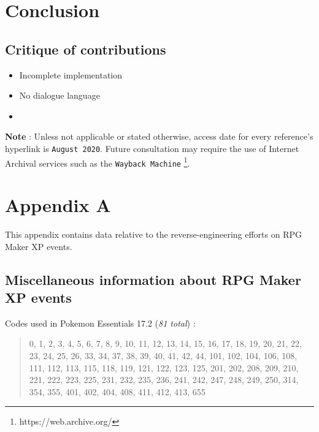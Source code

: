 \documentclass[11pt]{article}
\begin{document}
{\newpage 
\section{Conclusion}


\subsection{Critique of contributions}

\begin{itemize}
	\item Incomplete implementation
	\item No dialogue language
	\item 
\end{itemize}





\newpage

\nocite{*} %
\printbibliography[heading=bibintoc,title={Bibliography}]

\vspace{8mm}
\textbf{Note} : Unless not applicable or stated otherwise, access date for every reference's hyperlink is \texttt{August 2020}. Future consultation may require the use of Internet Archival services such as the \texttt{Wayback Machine} \footnote[1]{https://web.archive.org/}.



\newpage
\section*{Appendix A}

This appendix contains data relative to the reverse-engineering efforts on RPG Maker XP events.

\subsection*{Miscellaneous information about RPG Maker XP events}

Codes used in Pokemon Essentials 17.2 (\textit{81 total}) :
\begin{quote}
	0, 1, 2, 3, 4, 5, 6, 7, 8, 9, 10, 11, 12, 13, 14, 15, 16, 17, 18, 19, 20, 21, 22, 23, 24, 25, 26, 33, 34, 37, 38, 39, 40, 41, 42, 44, 101, 102, 104, 106, 108, 111, 112, 113, 115, 118, 119, 121, 122, 123, 125, 201, 202, 208, 209, 210, 221, 222, 223, 225, 231, 232, 235, 236, 241, 242, 247, 248, 249, 250, 314, 354, 355, 401, 402, 404, 408, 411, 412, 413, 655
\end{quote}

}
\end{document}
